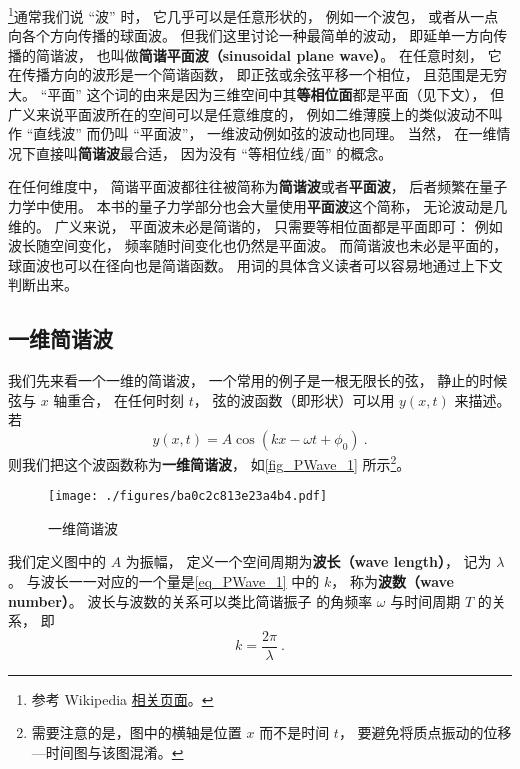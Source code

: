 

\footnote{参考 Wikipedia \href{https://en.wikipedia.org/wiki/Plane_wave}{相关页面}。}通常我们说 “波” 时， 它几乎可以是任意形状的， 例如一个波包， 或者从一点向各个方向传播的球面波。 但我们这里讨论一种最简单的波动， 即延单一方向传播的简谐波， 也叫做\textbf{简谐平面波（sinusoidal plane wave）}。 在任意时刻， 它在传播方向的波形是一个简谐函数， 即正弦或余弦平移一个相位， 且范围是无穷大。 “平面” 这个词的由来是因为三维空间中其\textbf{等相位面}都是平面（见下文）， 但广义来说平面波所在的空间可以是任意维度的， 例如二维薄膜上的类似波动不叫作 “直线波” 而仍叫 “平面波”， 一维波动例如弦的波动也同理。 当然， 在一维情况下直接叫\textbf{简谐波}最合适， 因为没有 “等相位线/面” 的概念。

在任何维度中， 简谐平面波都往往被简称为\textbf{简谐波}或者\textbf{平面波}， 后者频繁在量子力学中使用。 本书的量子力学部分也会大量使用\textbf{平面波}这个简称， 无论波动是几维的。 广义来说， 平面波未必是简谐的， 只需要等相位面都是平面即可： 例如波长随空间变化， 频率随时间变化也仍然是平面波。 而简谐波也未必是平面的， 球面波也可以在径向也是简谐函数。 用词的具体含义读者可以容易地通过上下文判断出来。

\subsection{一维简谐波}
我们先来看一个一维的简谐波， 一个常用的例子是一根无限长的弦， 静止的时候弦与 $x$ 轴重合， 在任何时刻 $t$， 弦的波函数（即形状）可以用 $y(x, t)$ 来描述。 若
\begin{equation}\label{eq_PWave_1}
y(x, t) = A\cos(k x - \omega t + \phi_0)~.
\end{equation}
则我们把这个波函数称为\textbf{一维简谐波}， 如\autoref{fig_PWave_1} 所示\footnote{需要注意的是，图中的横轴是位置 $x$ 而不是时间 $t$， 要避免将质点振动的位移—时间图与该图混淆。}。

\begin{figure}[ht]
\centering
\texttt{[image: ./figures/ba0c2c813e23a4b4.pdf]}
\caption{一维简谐波} \label{fig_PWave_1}
\end{figure}

我们定义图中的 $A$ 为振幅， 定义一个空间周期为\textbf{波长（wave length）}， 记为 $\lambda$。 与波长一一对应的一个量是\autoref{eq_PWave_1} 中的 $k$， 称为\textbf{波数（wave number）}。 波长与波数的关系可以类比简谐振子 的角频率 $\omega$ 与时间周期 $T$ 的关系， 即
\begin{equation}\label{eq_PWave_2}
k = \frac{2\pi}{\lambda}~.
\end{equation}

